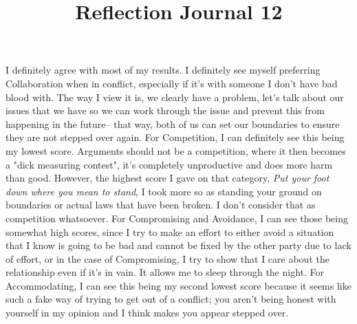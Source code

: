 \documentclass[12pt]{article}
\begin{document}
    
\title{Reflection Journal 12}

\par
I definitely agree with most of my results. I definitely see myself preferring Collaboration when in conflict, especially if it's with someone I don't have bad blood with. The way I view it is, we clearly have a problem, let's talk about our issues that we have so we can work through the issue and prevent this from happening in the future-- that way, both of us can set our boundaries to ensure they are not stepped over again. For Competition, I can definitely see this being my lowest score. Arguments should not be a competition, where it then becomes a "dick measuring contest", it's completely unproductive and does more harm than good. However, the highest score I gave on that category, \emph{Put your foot down where you mean to stand}, I took more so as standing your ground on boundaries or actual laws that have been broken. I don't consider that as competition whatsoever. For Compromising and Avoidance, I can see those being somewhat high scores, since I try to make an effort to either avoid a situation that I know is going to be bad and cannot be fixed by the other party due to lack of effort, or in the case of Compromising, I try to show that I care about the relationship even if it's in vain. It allows me to sleep through the night. For Accommodating, I can see this being my second lowest score because it seems like such a fake way of trying to get out of a conflict; you aren't being honest with yourself in my opinion and I think makes you appear stepped over.
\par
\end{document}
